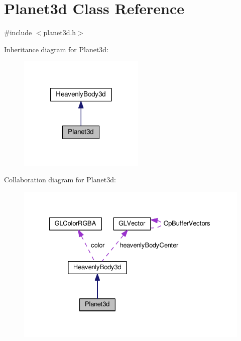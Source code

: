 \hypertarget{classPlanet3d}{
\section{\-Planet3d \-Class \-Reference}
\label{d1/d39/classPlanet3d}
}


{\ttfamily \#include $<$planet3d.\-h$>$}



\-Inheritance diagram for \-Planet3d\-:
\nopagebreak
\begin{figure}[H]
\begin{center}
\leavevmode
\includegraphics[width=170pt]{d7/d7e/classPlanet3d__inherit__graph}
\end{center}
\end{figure}


\-Collaboration diagram for \-Planet3d\-:
\nopagebreak
\begin{figure}[H]
\begin{center}
\leavevmode
\includegraphics[width=331pt]{d2/de3/classPlanet3d__coll__graph}
\end{center}
\end{figure}
